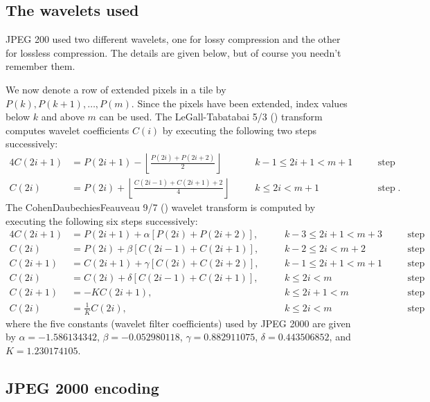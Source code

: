 \documentclass[a4paper, 11pt, openany]{book}
\begin{document}
\subsection{The wavelets used}

JPEG 200 used two different wavelets, one for lossy compression and the other for lossless compression. The details are given below, but of course you needn't remember them.

We now denote a row of extended pixels in a tile by $P(k), P(k+1), \dots , P(m)$. Since the pixels have been extended, index values below $k$ and above $m$ can be used. The LeGall-Tabatabai 5/3 () transform computes wavelet coefficients $C(i)$ by executing the following two steps successively:
\begin{alignat*}{4}
    C(2i + 1) &= P(2i + 1) - \left\lfloor \frac{P(2i) + P(2i + 2)}{2} \right\rfloor &\quad& k - 1 \le 2i + 1 < m+ 1 &\quad& \text{step 1}\\
    C(2i) &= P(2i) + \left\lfloor \frac{ C(2i - 1) + C(2i + 1) + 2 }{4} \right\rfloor &\quad&  k \le 2i < m+ 1 &\quad& \text{step 2}.
\end{alignat*}
The CohenDaubechiesFeauveau 9/7 () wavelet transform is computed by executing the following six steps successively:
\begin{alignat*}{4}
C(2i + 1) &= P(2i + 1) +  \alpha [P(2i) + P(2i + 2)], &\quad & k-3 \le 2i+1 < m+3 & \quad& \text{step 1}\\
C(2i) &= P(2i) + \beta[C(2i - 1) + C(2i + 1)], &\quad& k-2 \le 2i < m+2 &\quad& \text{step 2}\\
C(2i + 1) &= C(2i + 1) + \gamma[C(2i) + C(2i + 2)], &\quad& k-1 \le 2i+1 < m+1 &\quad& \text{step 3}\\
C(2i) &= C(2i) + \delta[C(2i - 1) + C(2i + 1)], &\quad& k \le 2i < m &\quad& \text{step 4}\\
C(2i + 1) &= -K C(2i + 1), &\quad& k \le 2i + 1 < m &\quad& \text{step 5}\\
C(2i) &=  \frac{1}{K} C(2i), &\quad& k \le 2i < m &\quad& \text{step 6}
\end{alignat*}
where the five constants (wavelet filter coefficients) used by JPEG 2000 are given by
$\alpha = -1.586134342$, $\beta = -0.052980118$, $\gamma = 0.882911075$, $\delta = 0.443506852$, and $K = 1.230174105$.



\subsection{JPEG 2000 encoding}
\end{document}
